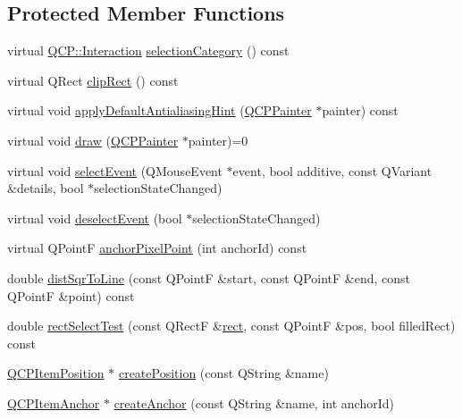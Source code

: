 \subsection*{Protected Member Functions}
\begin{DoxyCompactItemize}
\item 
virtual \hyperlink{namespace_q_c_p_a2ad6bb6281c7c2d593d4277b44c2b037}{Q\+C\+P\+::\+Interaction} \hyperlink{class_q_c_p_abstract_item_a777b5d384936396ad9c3ceb3d3453f1c}{selection\+Category} () const 
\item 
virtual Q\+Rect \hyperlink{class_q_c_p_abstract_item_a538e25ff8856534582f5b2b400a46405}{clip\+Rect} () const 
\item 
virtual void \hyperlink{class_q_c_p_abstract_item_a0839031abdd71067e2256a4d53c7a011}{apply\+Default\+Antialiasing\+Hint} (\hyperlink{class_q_c_p_painter}{Q\+C\+P\+Painter} $\ast$painter) const 
\item 
virtual void \hyperlink{class_q_c_p_abstract_item_ad0dc056f650c3ca73414e6b4f01674ef}{draw} (\hyperlink{class_q_c_p_painter}{Q\+C\+P\+Painter} $\ast$painter)=0
\item 
virtual void \hyperlink{class_q_c_p_abstract_item_aaf92af7b9893712959a6c073d334d88d}{select\+Event} (Q\+Mouse\+Event $\ast$event, bool additive, const Q\+Variant \&details, bool $\ast$selection\+State\+Changed)
\item 
virtual void \hyperlink{class_q_c_p_abstract_item_a91f090d6763cfedb0749219c63788ae9}{deselect\+Event} (bool $\ast$selection\+State\+Changed)
\item 
virtual Q\+Point\+F \hyperlink{class_q_c_p_abstract_item_a94bde62b8a2fc133666dcbb8035deeed}{anchor\+Pixel\+Point} (int anchor\+Id) const 
\item 
double \hyperlink{class_q_c_p_abstract_item_acdca343717d625b8abb3c3e38c0ed39d}{dist\+Sqr\+To\+Line} (const Q\+Point\+F \&start, const Q\+Point\+F \&end, const Q\+Point\+F \&point) const 
\item 
double \hyperlink{class_q_c_p_abstract_item_a4c0e14c4e92df91174cb7183fb363069}{rect\+Select\+Test} (const Q\+Rect\+F \&\hyperlink{_gen_blob_8m_aea8f6815d9a63491fc422c5572c6b3c3}{rect}, const Q\+Point\+F \&pos, bool filled\+Rect) const 
\item 
\hyperlink{class_q_c_p_item_position}{Q\+C\+P\+Item\+Position} $\ast$ \hyperlink{class_q_c_p_abstract_item_a75036d39c4d4e2e1a7dd145fff915d32}{create\+Position} (const Q\+String \&name)
\item 
\hyperlink{class_q_c_p_item_anchor}{Q\+C\+P\+Item\+Anchor} $\ast$ \hyperlink{class_q_c_p_abstract_item_af3fc92527802078ca395138748b629a7}{create\+Anchor} (const Q\+String \&name, int anchor\+Id)
\end{DoxyCompactItemize}
